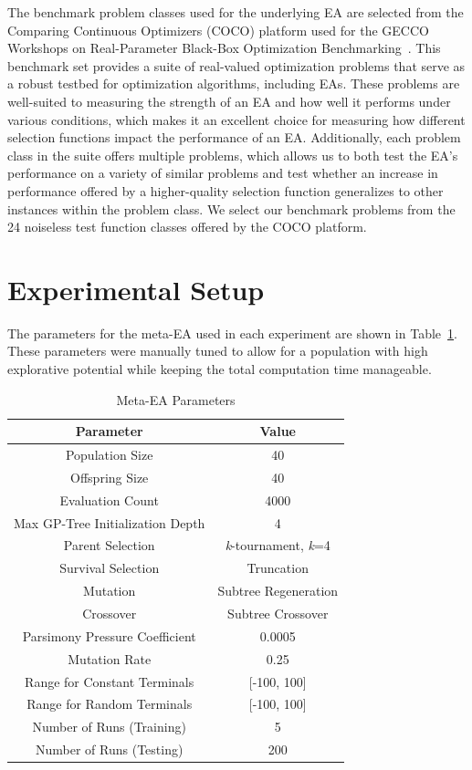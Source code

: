 \documentclass[sigconf]{acmart}
\begin{document}
The benchmark problem classes used for the underlying EA are selected from the Comparing Continuous Optimizers (COCO) platform used for the GECCO Workshops on Real-Parameter Black-Box Optimization Benchmarking~\citep{cocobbob}. This benchmark set provides a suite of real-valued optimization problems that serve as a robust testbed for optimization algorithms, including EAs. These problems are well-suited to measuring the strength of an EA and how well it performs under various conditions, which makes it an excellent choice for measuring how different selection functions impact the performance of an EA. Additionally, each problem class in the suite offers multiple problems, which allows us to both test the EA's performance on a variety of similar problems and test whether an increase in performance offered by a higher-quality selection function generalizes to other instances within the problem class. We select our benchmark problems from the 24 noiseless test function classes offered by the COCO platform.

\section{Experimental Setup}
\label{Primary Experiments}

The parameters for the meta-EA used in each experiment are shown in Table~\ref{tab:Meta-EA Parameters}. These parameters were manually tuned to allow for a population with high explorative potential while keeping the total computation time manageable.

\begin{table}
	\centering
	\caption{Meta-EA Parameters}
	\label{tab:Meta-EA Parameters}
	\begin{tabular}{c|c}
		\toprule
		Parameter& Value\\
		\midrule
		Population Size & 40 \\
		\hline
		Offspring Size & 40\\
		\hline
		Evaluation Count & 4000\\
		\hline
		Max GP-Tree Initialization Depth & 4\\
		\hline
		Parent Selection & \textit{k}-tournament, \textit{k}=4 \\
		\hline
		Survival Selection & Truncation\\
		\hline
		Mutation & Subtree Regeneration\\
		\hline
		Crossover & Subtree Crossover\\
		\hline
		Parsimony Pressure Coefficient & 0.0005\\
		\hline
		Mutation Rate & 0.25\\
		\hline
		Range for Constant Terminals & [-100, 100]\\
		\hline
		Range for Random Terminals & [-100, 100]\\
		\hline
		Number of Runs (Training) & 5 \\
		\hline
		Number of Runs (Testing) & 200\\
		
		\bottomrule
	\end{tabular}
\end{table}
\end{document}
